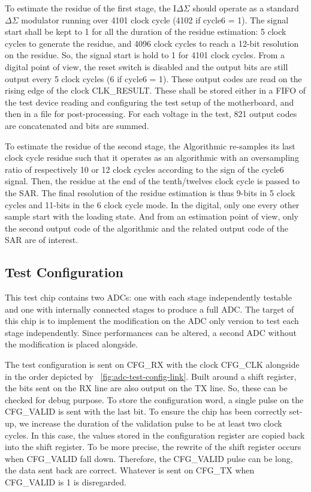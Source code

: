To estimate the residue of the first stage, the I\(\Delta \Sigma\) should operate as a standard \(\Delta \Sigma\) modulator running over 4101 clock cycle (4102 if cycle6 = 1). The signal start shall be kept to 1 for all the duration of the residue estimation: 5 clock cycles to generate the residue, and 4096 clock cycles to reach a 12-bit resolution on the residue. So, the signal start is hold to 1 for 4101 clock cycles. From a digital point of view, the reset switch is disabled and the output bits are still output every 5 clock cycles (6 if cycle6 = 1). These output codes are read on the rising edge of the clock CLK\_RESULT\@. These shall be stored either in a FIFO of the test device reading and configuring the test setup of the motherboard, and then in a file for post-processing. For each voltage in the test, 821 output codes are concatenated and bits are summed.

To estimate the residue of the second stage, the Algorithmic re-samples its last clock cycle residue such that it operates as an algorithmic with an oversampling ratio of respectively 10 or 12 clock cycles according to the sign of the cycle6 signal. Then, the residue at the end of the tenth/twelves clock cycle is passed to the SAR\@. The final resolution of the residue estimation is thus 9-bits in 5 clock cycles and 11-bits in the 6 clock cycle mode. In the digital, only one every other sample start with the loading state. And from an estimation point of view, only the second output code of the algorithmic and the related output code of the SAR are of interest.

\subsection{Test Configuration}
This test chip contains two ADCs: one with each stage independently testable and one with internally connected stages to produce a full ADC\@. The target of this chip is to implement the modification on the ADC only version to test each stage independently. Since performances can be altered, a second ADC without the modification is placed alongside.

The test configuration is sent on CFG\_RX with the clock CFG\_CLK alongside in the order depicted by \figurename~\ref{fig:adc-test-config-link}. Built around a shift register, the bits sent on the RX line are also output on the TX line. So, these can be checked for debug purpose. To store the configuration word, a single pulse on the CFG\_VALID is sent with the last bit. To ensure the chip has been correctly set-up, we increase the duration of the validation pulse to be at least two clock cycles. In this case, the values stored in the configuration register are copied back into the shift register. To be more precise, the rewrite of the shift register occurs when CFG\_VALID fall down. Therefore, the CFG\_VALID pulse can be long, the data sent back are correct. Whatever is sent on CFG\_TX when CFG\_VALID is 1 is disregarded.

